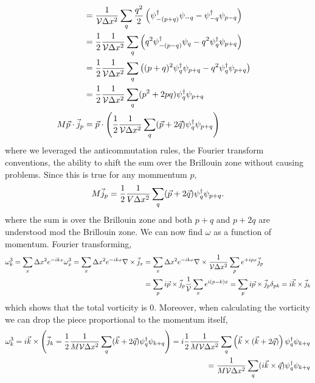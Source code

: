 \begin{align}
\nonumber\\
	&=
	\frac{1}{\mathcal{V} \Delta x^2}\sum_{q} \frac{q^2}{2} \left(\psi{}^{\dagger}_{-(p+q)} \psi_{-q} - \psi{}^{\dagger}_{-q} \psi_{p-q} \right)
\nonumber\\
	&=
	\frac{1}{2} \frac{1}{\mathcal{V} \Delta x^2}\sum_{q} \left(q^2\psi{}^{\dagger}_{-(p-q)} \psi_q - q^2 \psi{}^{\dagger}_{q} \psi_{p+q} \right)
\nonumber\\
	&=
	\frac{1}{2} \frac{1}{\mathcal{V} \Delta x^2}\sum_{q} \left((p+q)^2\psi{}^{\dagger}_{q} \psi_{p+q} - q^2 \psi{}^{\dagger}_{q} \psi_{p+q} \right)
\nonumber\\
	&=
	\frac{1}{2} \frac{1}{\mathcal{V} \Delta x^2}\sum_{q} (p^2 + 2pq)\psi{}^{\dagger}_{q} \psi_{p+q}
\nonumber\\
	M \vec{p} \cdot \vec{j}_p
	&=
	\vec{p} \cdot \left(\frac{1}{2} \frac{1}{\mathcal{V} \Delta x^2} \sum_q (\vec{p}+2\vec{q}) \psi{}^{\dagger}_q\psi_{p+q}\right)
\end{align}
where we leveraged the anticommutation rules, the Fourier transform conventions, the ability to shift the sum over the Brillouin zone without causing problems.
Since this is true for any mommentum $p$,
\begin{align}
	M \vec{j}_p = \frac{1}{2}\frac{1}{V\Delta x^2} \sum_q (\vec{p}+2\vec{q}) \psi{}^{\dagger}_{q} \psi_{p+q}.
\end{align}
where the sum is over the Brillouin zone and both $p+q$ and $p+2q$ are understood mod the Brillouin zone.
We can now find $\omega$ as a function of momentum.
Fourier transforming,
\begin{align}
	\omega^3_k
	= \sum_x \Delta x^2 e^{-ikx} \omega^3_x
	= \sum_x \Delta x^2 e^{-ikx} \nabla \times \vec{j}_x
	&= \sum_x \Delta x^2 e^{-ikx} \nabla \times \frac{1}{\mathcal{V} \Delta x^2} \sum_p e^{+ipx} \vec{j}_p
\nonumber\\
	&= \sum_p i\vec{p} \times \vec{j}_p \frac{1}{\mathcal{V}} \sum_x e^{i(p-k)x}
	= \sum_p i\vec{p} \times \vec{j}_p \delta_{pk}
	= i \vec{k} \times \vec{j}_k
\end{align}
which shows that the total vorticity is 0.
Moreover, when calculating the vorticity we can drop the piece proportional to the momentum itself,
\begin{align}
	\omega^3_k
	= i \vec{k} \times \left(\vec{j}_k = \frac{1}{2}\frac{1}{M \mathcal{V}\Delta x^2} \sum_q (\vec{k}+2\vec{q}) \psi{}^{\dagger}_{q} \psi_{k+q}\right)
	= i \frac{1}{2}\frac{1}{M \mathcal{V}\Delta x^2} \sum_q \left(\vec{k} \times (\vec{k}+2\vec{q})\right) \psi{}^{\dagger}_{q} \psi_{k+q}
\nonumber\\
	= \frac{1}{M \mathcal{V}\Delta x^2} \sum_q (i\vec{k} \times \vec{q}) \psi{}^{\dagger}_{q} \psi_{k+q}
\end{align}


